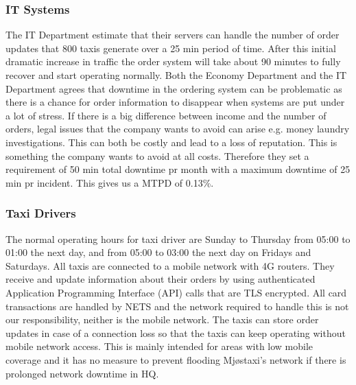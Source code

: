 \subsubsection*{IT Systems}
\vspace{-0.6em}
The IT Department estimate that their servers can handle the number of order updates that 800 taxis generate over a 25 min period of time.
After this initial dramatic increase in traffic the order system will take about 90 minutes to fully recover and start operating normally.
Both the Economy Department and the IT Department agrees that downtime in the ordering system can be problematic as there is a chance for order information to disappear when systems are put under a lot of stress. 
If there is a big difference between income and the number of orders, legal issues that the company wants to avoid can arise e.g. money laundry investigations.
This can both be costly and lead to a loss of reputation. This is something the company wants to avoid at all costs.
Therefore they set a requirement of 50 min total downtime pr month with a maximum downtime of 25 min pr incident. 
This gives us a MTPD of 0.13\%.

\subsubsection*{Taxi Drivers}
\vspace{-0.6em}
The normal operating hours for taxi driver are Sunday to Thursday from 05:00 to 01:00 the next day, and from 05:00 to 03:00 the next day on Fridays and Saturdays.
All taxis are connected to a mobile network with 4G routers.
They receive and update information about their orders by using authenticated Application Programming Interface (API) calls that are TLS encrypted.
All card transactions are handled by NETS and the network required to handle this is not our responsibility, neither is the mobile network.
The taxis can store order updates in case of a connection loss so that the taxis can keep operating without mobile network access.
This is mainly intended for areas with low mobile coverage and it has no measure to prevent flooding Mjøstaxi's network if there is prolonged network downtime in HQ.

